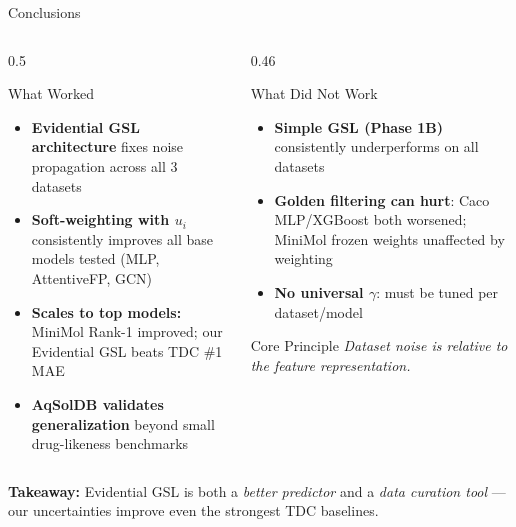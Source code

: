\documentclass[aspectratio=169]{beamer}
\begin{document}
\begin{frame}[t,shrink=10]{Conclusions}
\begin{columns}[T]
\begin{column}{0.5\textwidth}
\begin{block}{What Worked}
\footnotesize
\begin{itemize}
  \item \textbf{Evidential GSL architecture} fixes noise propagation across all 3 datasets
  \item \textbf{Soft-weighting with $u_i$} consistently improves all base models tested (MLP, AttentiveFP, GCN)
  \item \textbf{Scales to top models:} MiniMol Rank-1 improved; our Evidential GSL beats TDC \#1 MAE
  \item \textbf{AqSolDB validates generalization} beyond small drug-likeness benchmarks
\end{itemize}
\end{block}
\end{column}
\begin{column}{0.46\textwidth}
\begin{alertblock}{What Did Not Work}
\footnotesize
\begin{itemize}
  \item \textbf{Simple GSL (Phase 1B)} consistently underperforms on all datasets
  \item \textbf{Golden filtering can hurt}: Caco MLP/XGBoost both worsened; MiniMol frozen weights unaffected by weighting
  \item \textbf{No universal $\gamma$}: must be tuned per dataset/model
\end{itemize}
\end{alertblock}
\vspace{2pt}
\begin{block}{Core Principle}
\centering\footnotesize \textit{Dataset noise is relative to the feature representation.}
\end{block}
\end{column}
\end{columns}
\vspace{8pt}
\begin{center}
\textbf{Takeaway:} Evidential GSL is both a \emph{better predictor} and a \emph{data curation tool} — our uncertainties improve even the strongest TDC baselines.
\end{center}
\end{frame}
\end{document}
